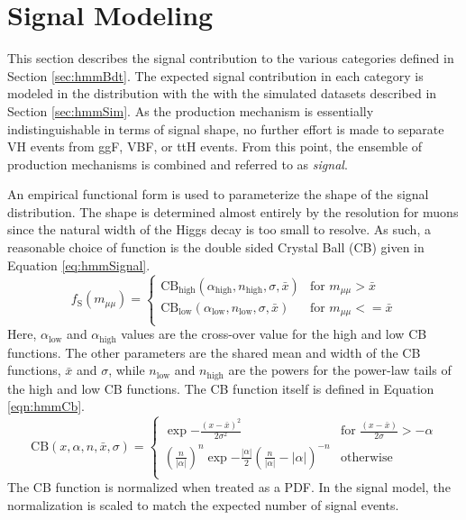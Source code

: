 \section{Signal Modeling}\label{sec:hmmSig}

This section describes the signal contribution to the various categories defined in Section \ref{sec:hmmBdt}.
The expected signal contribution in each category is modeled in the \muu distribution with the with the simulated datasets described in Section \ref{sec:hmmSim}.
As the production mechanism is essentially indistinguishable in terms of signal shape, no further effort is made to separate VH events from ggF, VBF, or ttH events.
From this point, the ensemble of production mechanisms is combined and referred to as \emph{signal}.

An empirical functional form is used to parameterize the shape of the signal distribution.
The shape is determined almost entirely by the \pt resolution for muons since the natural width of the Higgs decay is too small to resolve.
As such, a reasonable choice of function is the double sided Crystal Ball (CB) given in Equation \ref{eq:hmmSignal}.
\begin{equation}\label{eq:hmmSignal}
  f_\text{S}(m_{\mu\mu}) =
  \begin{cases}
  \text{CB}_\text{high}(\alpha_\text{high},n_\text{high},\sigma,\bar{x}) & \text{for }m_{\mu\mu}>\bar{x}\\
  \text{CB}_\text{low}(\alpha_\text{low},n_\text{low},\sigma,\bar{x}) & \text{for }m_{\mu\mu}<=\bar{x}\\
  \end{cases}
\end{equation}
Here, $\alpha_\text{low}$ and $\alpha_\text{high}$ values are the cross-over value for the high and low CB functions.
The other parameters are the shared mean and width of the CB functions, $\bar{x}$ and $\sigma$,
while $n_\text{low}$ and $n_\text{high}$ are the powers for the power-law tails of the high and low CB functions.
The CB function itself is defined in Equation \ref{eqn:hmmCb}.
\begin{equation}\label{eqn:hmmCb}
    \text{CB}(x,\alpha,n,\bar{x},\sigma) = 
    \begin{cases}
        \exp{-\frac{(x-\bar{x})^2}{2\sigma^2}} & \text{for }\frac{(x-\bar{x})}{2\sigma}>-\alpha \\
        \left(\frac{n}{|\alpha|}\right)^n \exp{-\frac{|\alpha|}{2}} \left(\frac{n}{|\alpha|}-|\alpha|\right)^{-n} & \text{otherwise}\\
    \end{cases}
\end{equation}
The CB function is normalized when treated as a PDF.
In the signal model, the normalization is scaled to match the expected number of signal events.

